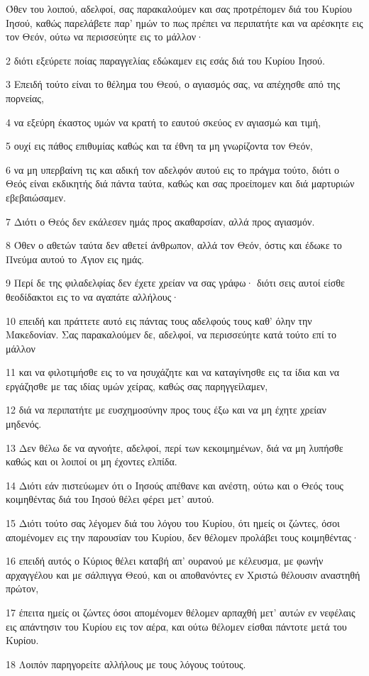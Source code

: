 \par Όθεν του λοιπού, αδελφοί, σας παρακαλούμεν και σας προτρέπομεν διά του Κυρίου Ιησού, καθώς παρελάβετε παρ' ημών το πως πρέπει να περιπατήτε και να αρέσκητε εις τον Θεόν, ούτω να περισσεύητε εις το μάλλον·
\par 2 διότι εξεύρετε ποίας παραγγελίας εδώκαμεν εις εσάς διά του Κυρίου Ιησού.
\par 3 Επειδή τούτο είναι το θέλημα του Θεού, ο αγιασμός σας, να απέχησθε από της πορνείας,
\par 4 να εξεύρη έκαστος υμών να κρατή το εαυτού σκεύος εν αγιασμώ και τιμή,
\par 5 ουχί εις πάθος επιθυμίας καθώς και τα έθνη τα μη γνωρίζοντα τον Θεόν,
\par 6 να μη υπερβαίνη τις και αδική τον αδελφόν αυτού εις το πράγμα τούτο, διότι ο Θεός είναι εκδικητής διά πάντα ταύτα, καθώς και σας προείπομεν και διά μαρτυριών εβεβαιώσαμεν.
\par 7 Διότι ο Θεός δεν εκάλεσεν ημάς προς ακαθαρσίαν, αλλά προς αγιασμόν.
\par 8 Όθεν ο αθετών ταύτα δεν αθετεί άνθρωπον, αλλά τον Θεόν, όστις και έδωκε το Πνεύμα αυτού το Άγιον εις ημάς.
\par 9 Περί δε της φιλαδελφίας δεν έχετε χρείαν να σας γράφω· διότι σεις αυτοί είσθε θεοδίδακτοι εις το να αγαπάτε αλλήλους·
\par 10 επειδή και πράττετε αυτό εις πάντας τους αδελφούς τους καθ' όλην την Μακεδονίαν. Σας παρακαλούμεν δε, αδελφοί, να περισσεύητε κατά τούτο επί το μάλλον
\par 11 και να φιλοτιμήσθε εις το να ησυχάζητε και να καταγίνησθε εις τα ίδια και να εργάζησθε με τας ιδίας υμών χείρας, καθώς σας παρηγγείλαμεν,
\par 12 διά να περιπατήτε με ευσχημοσύνην προς τους έξω και να μη έχητε χρείαν μηδενός.
\par 13 Δεν θέλω δε να αγνοήτε, αδελφοί, περί των κεκοιμημένων, διά να μη λυπήσθε καθώς και οι λοιποί οι μη έχοντες ελπίδα.
\par 14 Διότι εάν πιστεύωμεν ότι ο Ιησούς απέθανε και ανέστη, ούτω και ο Θεός τους κοιμηθέντας διά του Ιησού θέλει φέρει μετ' αυτού.
\par 15 Διότι τούτο σας λέγομεν διά του λόγου του Κυρίου, ότι ημείς οι ζώντες, όσοι απομένομεν εις την παρουσίαν του Κυρίου, δεν θέλομεν προλάβει τους κοιμηθέντας·
\par 16 επειδή αυτός ο Κύριος θέλει καταβή απ' ουρανού με κέλευσμα, με φωνήν αρχαγγέλου και με σάλπιγγα Θεού, και οι αποθανόντες εν Χριστώ θέλουσιν αναστηθή πρώτον,
\par 17 έπειτα ημείς οι ζώντες όσοι απομένομεν θέλομεν αρπαχθή μετ' αυτών εν νεφέλαις εις απάντησιν του Κυρίου εις τον αέρα, και ούτω θέλομεν είσθαι πάντοτε μετά του Κυρίου.
\par 18 Λοιπόν παρηγορείτε αλλήλους με τους λόγους τούτους.

